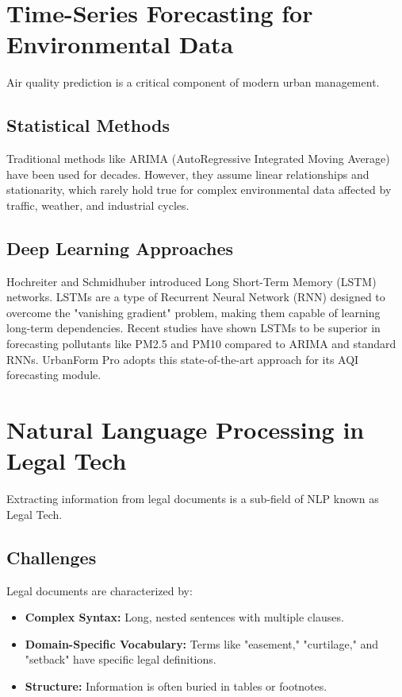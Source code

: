\documentclass[12pt,a4paper]{report}
\begin{document}
\section{Time-Series Forecasting for Environmental Data}
Air quality prediction is a critical component of modern urban management. 

\subsection{Statistical Methods}
Traditional methods like ARIMA (AutoRegressive Integrated Moving Average) have been used for decades. However, they assume linear relationships and stationarity, which rarely hold true for complex environmental data affected by traffic, weather, and industrial cycles.

\subsection{Deep Learning Approaches}
Hochreiter and Schmidhuber \cite{hochreiter1997long} introduced Long Short-Term Memory (LSTM) networks. LSTMs are a type of Recurrent Neural Network (RNN) designed to overcome the "vanishing gradient" problem, making them capable of learning long-term dependencies. Recent studies have shown LSTMs to be superior in forecasting pollutants like PM2.5 and PM10 compared to ARIMA and standard RNNs. UrbanForm Pro adopts this state-of-the-art approach for its AQI forecasting module.

\section{Natural Language Processing in Legal Tech}
Extracting information from legal documents is a sub-field of NLP known as Legal Tech.
\subsection{Challenges}
Legal documents are characterized by:
\begin{itemize}
    \item \textbf{Complex Syntax:} Long, nested sentences with multiple clauses.
    \item \textbf{Domain-Specific Vocabulary:} Terms like "easement," "curtilage," and "setback" have specific legal definitions.
    \item \textbf{Structure:} Information is often buried in tables or footnotes.
\end{itemize}
\end{document}
